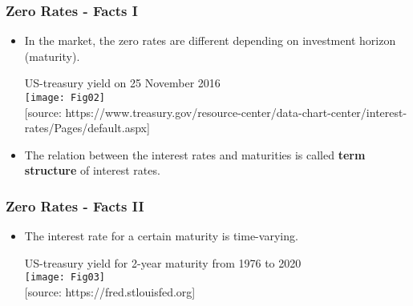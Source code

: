\documentclass[10pt]{beamer}
\begin{document}
	

\begin{frame}
	\frametitle{Zero Rates - Facts I}
	\begin{itemize}\itemsep5pt
		\item In the market, the zero rates are different depending on investment horizon (maturity).\\ \vspace{10pt}		
		\begin{center}
		{\scriptsize US-treasury yield on 25 November 2016}\\
			\texttt{[image: Fig02]} \\
		{\tiny [source: https://www.treasury.gov/resource-center/data-chart-center/interest-rates/Pages/default.aspx] }
		\end{center}
		\item The relation between the interest rates and maturities is called \textbf{term structure} of interest rates.
	\end{itemize}
\end{frame}

\begin{frame}
	\frametitle{Zero Rates - Facts II}
	\begin{itemize} \itemsep15pt
		\item The interest rate for a certain maturity is time-varying. \\ \vspace{10pt}
		\begin{center}
		{\scriptsize US-treasury yield for 2-year maturity from 1976 to 2020}\\
			\texttt{[image: Fig03]} \\
		{\tiny [source: https://fred.stlouisfed.org] }
		\end{center}
	\end{itemize}
\end{frame}
\end{document}
